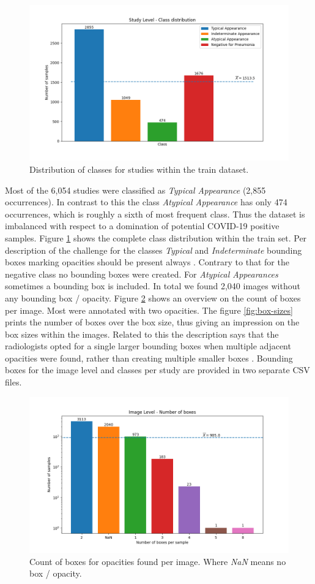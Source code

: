 \begin{figure}
	\centering
	\includegraphics[width=.75\linewidth]{img/class_distrinution_study.png}
	\caption{Distribution of classes for studies within the train dataset.}
	\label{fig:study-class-distribution}
\end{figure}

Most of the 6,054 studies were classified as \textit{Typical Appearance} (2,855 occurrences). In contrast to this the class \textit{Atypical Appearance} has only 474 occurrences, which is roughly a sixth of most frequent class. Thus the dataset is imbalanced with respect to a domination of potential COVID-19 positive samples. Figure \ref{fig:study-class-distribution} shows the complete class distribution within the train set. Per description of the challenge for the classes \textit{Typical} and \textit{Indeterminate} bounding boxes marking opacities should be present always \autocite{SIIMKaggleAnnotation}. Contrary to that for the negative class no bounding boxes were created. For \textit{Atypical Appearances} sometimes a bounding box is included. In total we found 2,040 images without any bounding box / opacity. Figure \ref{fig:boxes-per-images} shows an overview on the count of boxes per image. Most were annotated with two opacities. The figure \ref{fig:box-sizes} prints the number of boxes over the box size, thus giving an impression on the box sizes within the images. Related to this the description says that the radiologists opted for a single larger bounding boxes when multiple adjacent opacities were found, rather than creating multiple smaller boxes \autocite{SIIMKaggleAnnotation}. Bounding boxes for the image level and classes per study are provided in two separate CSV files.

\begin{figure}
		\centering
		\includegraphics[width=.75\linewidth]{img/box_distribution_image.png}
		\caption{Count of boxes for opacities found per image. Where \textit{NaN} means no box / opacity.}
		\label{fig:boxes-per-images}
\end{figure}

